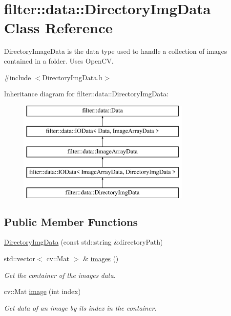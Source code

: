 \hypertarget{classfilter_1_1data_1_1_directory_img_data}{}\section{filter\+:\+:data\+:\+:Directory\+Img\+Data Class Reference}
\label{classfilter_1_1data_1_1_directory_img_data}


Directory\+Image\+Data is the data type used to handle a collection of images contained in a folder. Uses Open\+CV.  




{\ttfamily \#include $<$Directory\+Img\+Data.\+h$>$}

Inheritance diagram for filter\+:\+:data\+:\+:Directory\+Img\+Data\+:\begin{figure}[H]
\begin{center}
\leavevmode
\includegraphics[height=5.000000cm]{d6/dd6/classfilter_1_1data_1_1_directory_img_data}
\end{center}
\end{figure}
\subsection*{Public Member Functions}
\begin{DoxyCompactItemize}
\item 
\hyperlink{classfilter_1_1data_1_1_directory_img_data_a7005a24110c2fe7de63a13bd4a082074}{Directory\+Img\+Data} (const std\+::string \&directory\+Path)
\item 
std\+::vector$<$ cv\+::\+Mat $>$ \& \hyperlink{classfilter_1_1data_1_1_directory_img_data_ae582abd2529b225ccdfe4d268333051f}{images} ()
\begin{DoxyCompactList}\small\item\em Get the container of the images\textquotesingle{} data. \end{DoxyCompactList}\item 
cv\+::\+Mat \hyperlink{classfilter_1_1data_1_1_directory_img_data_a2d2f7b78ebdc9adc1842447bec9f4fcb}{image} (int index)
\begin{DoxyCompactList}\small\item\em Get data of an image by its index in the container. \end{DoxyCompactList}\end{DoxyCompactItemize}

